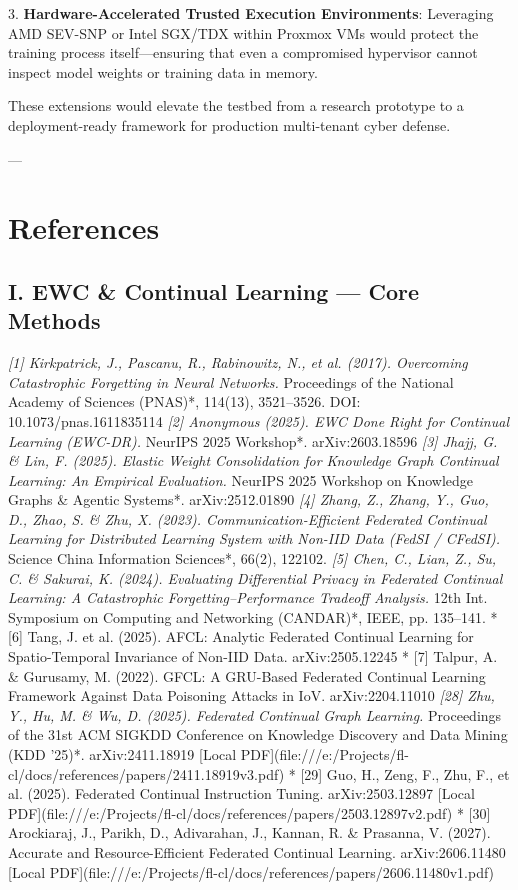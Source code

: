 \documentclass[conference]{IEEEtran}
\begin{document}
3. \textbf{Hardware-Accelerated Trusted Execution Environments}: Leveraging AMD SEV-SNP or Intel SGX/TDX within Proxmox VMs would protect the training process itself—ensuring that even a compromised hypervisor cannot inspect model weights or training data in memory.

These extensions would elevate the testbed from a research prototype to a deployment-ready framework for production multi-tenant cyber defense.

---


\section{References}


\subsection{I. EWC & Continual Learning — Core Methods}
\textit{ [1] Kirkpatrick, J., Pascanu, R., Rabinowitz, N., et al. (2017). Overcoming Catastrophic Forgetting in Neural Networks. }Proceedings of the National Academy of Sciences (PNAS)*, 114(13), 3521–3526. DOI: 10.1073/pnas.1611835114
\textit{ [2] Anonymous (2025). EWC Done Right for Continual Learning (EWC-DR). }NeurIPS 2025 Workshop*. arXiv:2603.18596
\textit{ [3] Jhajj, G. \& Lin, F. (2025). Elastic Weight Consolidation for Knowledge Graph Continual Learning: An Empirical Evaluation. }NeurIPS 2025 Workshop on Knowledge Graphs \& Agentic Systems*. arXiv:2512.01890
\textit{ [4] Zhang, Z., Zhang, Y., Guo, D., Zhao, S. \& Zhu, X. (2023). Communication-Efficient Federated Continual Learning for Distributed Learning System with Non-IID Data (FedSI / CFedSI). }Science China Information Sciences*, 66(2), 122102.
\textit{ [5] Chen, C., Lian, Z., Su, C. \& Sakurai, K. (2024). Evaluating Differential Privacy in Federated Continual Learning: A Catastrophic Forgetting–Performance Tradeoff Analysis. }12th Int. Symposium on Computing and Networking (CANDAR)*, IEEE, pp. 135–141.
* [6] Tang, J. et al. (2025). AFCL: Analytic Federated Continual Learning for Spatio-Temporal Invariance of Non-IID Data. arXiv:2505.12245
* [7] Talpur, A. \& Gurusamy, M. (2022). GFCL: A GRU-Based Federated Continual Learning Framework Against Data Poisoning Attacks in IoV. arXiv:2204.11010
\textit{ [28] Zhu, Y., Hu, M. \& Wu, D. (2025). Federated Continual Graph Learning. }Proceedings of the 31st ACM SIGKDD Conference on Knowledge Discovery and Data Mining (KDD '25)*. arXiv:2411.18919 [Local PDF](file:///e:/Projects/fl-cl/docs/references/papers/2411.18919v3.pdf)
* [29] Guo, H., Zeng, F., Zhu, F., et al. (2025). Federated Continual Instruction Tuning. arXiv:2503.12897 [Local PDF](file:///e:/Projects/fl-cl/docs/references/papers/2503.12897v2.pdf)
* [30] Arockiaraj, J., Parikh, D., Adivarahan, J., Kannan, R. \& Prasanna, V. (2027). Accurate and Resource-Efficient Federated Continual Learning. arXiv:2606.11480 [Local PDF](file:///e:/Projects/fl-cl/docs/references/papers/2606.11480v1.pdf)
\end{document}
